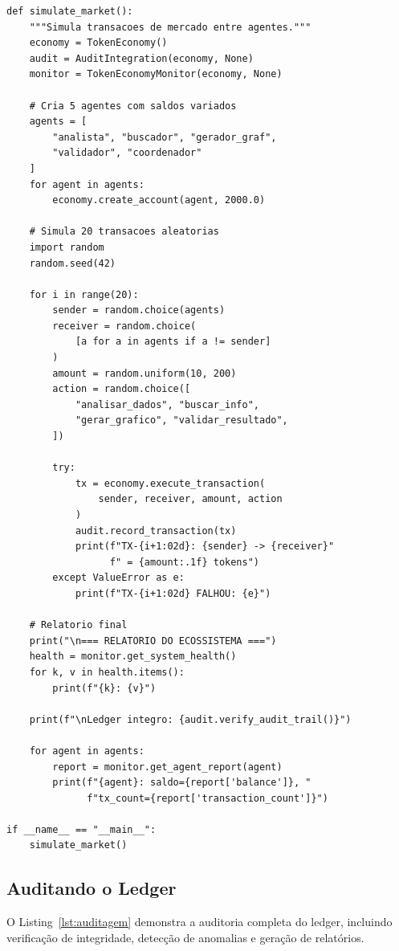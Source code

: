 \begin{lstlisting}[caption={Simulacao de mercado entre agentes},
                  label={lst:simulacao}]
def simulate_market():
    """Simula transacoes de mercado entre agentes."""
    economy = TokenEconomy()
    audit = AuditIntegration(economy, None)
    monitor = TokenEconomyMonitor(economy, None)

    # Cria 5 agentes com saldos variados
    agents = [
        "analista", "buscador", "gerador_graf",
        "validador", "coordenador"
    ]
    for agent in agents:
        economy.create_account(agent, 2000.0)

    # Simula 20 transacoes aleatorias
    import random
    random.seed(42)

    for i in range(20):
        sender = random.choice(agents)
        receiver = random.choice(
            [a for a in agents if a != sender]
        )
        amount = random.uniform(10, 200)
        action = random.choice([
            "analisar_dados", "buscar_info",
            "gerar_grafico", "validar_resultado",
        ])

        try:
            tx = economy.execute_transaction(
                sender, receiver, amount, action
            )
            audit.record_transaction(tx)
            print(f"TX-{i+1:02d}: {sender} -> {receiver}"
                  f" = {amount:.1f} tokens")
        except ValueError as e:
            print(f"TX-{i+1:02d} FALHOU: {e}")

    # Relatorio final
    print("\n=== RELATORIO DO ECOSSISTEMA ===")
    health = monitor.get_system_health()
    for k, v in health.items():
        print(f"{k}: {v}")

    print(f"\nLedger integro: {audit.verify_audit_trail()}")

    for agent in agents:
        report = monitor.get_agent_report(agent)
        print(f"{agent}: saldo={report['balance']}, "
              f"tx_count={report['transaction_count']}")

if __name__ == "__main__":
    simulate_market()
\end{lstlisting}

\subsection{Auditando o Ledger}

O Listing~\ref{lst:auditagem} demonstra a auditoria completa do
ledger, incluindo verificação de integridade, detecção de
anomalias e geração de relatórios.

